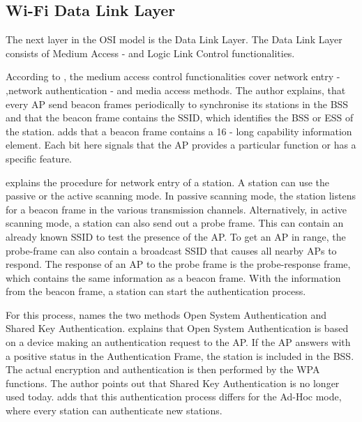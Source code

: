 \subsection*{Wi-Fi Data Link Layer}

The next layer in the OSI model is the Data Link Layer.
The Data Link Layer consists of Medium Access - and Logic Link Control functionalities.


According to \textcite{kauffels_wireless_2002}, the medium access control functionalities cover network entry - ,network authentication - and media access methods.
The author explains, that every \ac{AP} send beacon frames periodically to synchronise its stations in the \ac{BSS} and that the beacon frame contains the \ac{SSID}, which identifies the \ac{BSS} or \ac{ESS} of the station. \textcite{sauter_wireless_2022} adds that a beacon frame contains a \SI{16}{\bit} - long capability information element. Each bit here signals that the \ac{AP} provides a particular function or has a specific feature.

\textcite{kauffels_wireless_2002} explains the procedure for network entry of a station.
A station can use the passive or the active scanning mode.
In passive scanning mode, the station listens for a beacon frame in the various transmission channels.
Alternatively, in active scanning mode, a station can also send out a probe frame.
This can contain an already known \ac{SSID} to test the presence of the \ac{AP}.
To get an \ac{AP} in range, the probe-frame can also contain a broadcast SSID that causes all nearby \ac{AP}s to respond.
The response of an \ac{AP} to the probe frame is the probe-response frame, which contains the same information as a beacon frame.
With the information from the beacon frame, a station can start the authentication process.

For this process, \textcite{kauffels_wireless_2002} names the two methods Open System Authentication and Shared Key Authentication.
\textcite{sauter_wireless_2022} explains that Open System Authentication is based on a device making an authentication
request to the \ac{AP}. If the \ac{AP} answers with a positive status in the Authentication Frame,
the station is included in the \ac{BSS}.
The actual encryption and authentication is then performed by the \ac{WPA} functions.
The author points out that Shared Key Authentication is no longer used today.
\textcite{Sommer} adds that this authentication process differs for the Ad-Hoc mode, where every station can
authenticate new stations.

